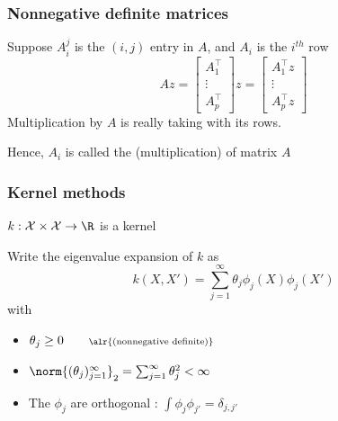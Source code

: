 \documentclass[12pt]{beamer}
\newcommand{\parenthetical}[2]{#1  \scriptstyle \alr{( #2)}}
\begin{document}
\begin{frame}
\frametitle{Nonnegative definite matrices}

Suppose $A_i^j$ is the $(i,j)$ entry in $A$, and $A_i$ is the $i^{th}$ row
\[
Az = 
\begin{bmatrix}
A_1^{\top} \\
\vdots \\
A_p^{\top}
\end{bmatrix}
z
=
\begin{bmatrix}
A_1^{\top}z \\
\vdots\\
A_p^{\top}z
\end{bmatrix}
\]
 Multiplication by $A$ is really taking  with its rows.
\vsp

Hence, $A_i$ is called the (multiplication)  of matrix $A$
\end{frame}


\begin{frame}
\frametitle{Kernel methods}
$k:\mathcal{X}\times\mathcal{X} \rightarrow \R$ is a 
 kernel

\vsp


\vsp
Write the eigenvalue expansion of $k$ as
\[
k(X,X') = \sum_{j=1}^\infty \theta_j \phi_j(X)\phi_j(X')
\]
with

\begin{itemize}
\item $\theta_j \geq 0 \parenthetical{\qquad}{\textrm{nonnegative definite}}$
\item $\norm{(\theta_j)_{j=1}^\infty}_2  = \sum_{j=1}^\infty \theta_j^2 < \infty$
\item The $\phi_j$ are orthogonal : $\int \phi_j \phi_{j'} = \delta_{j,j'}$
\end{itemize}
\end{frame}
\end{document}
